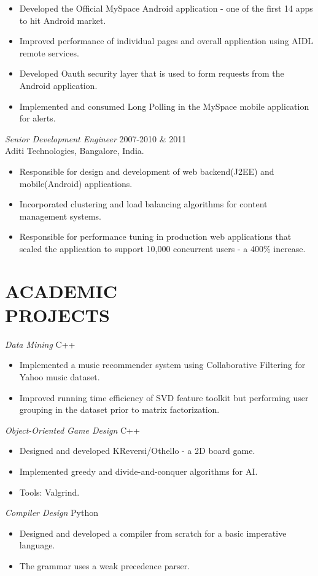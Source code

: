 \documentclass[line,margin]{res}
\begin{document}
\begin{resume}
\begin{itemize}
			\item Developed the Official MySpace Android application - one of the first 14 apps to hit Android market.
			\item Improved performance of individual pages and overall application using AIDL
			remote services.
			\item Developed Oauth security layer that is used to form requests from the Android application. 
			\item Implemented and consumed Long Polling in the MySpace mobile application for alerts.
		\end{itemize} 
		{\sl Senior Development Engineer} \hfill        2007-2010 \& 2011 \\
		Aditi Technologies, Bangalore, India.
		\begin{itemize}
			\item Responsible for design and development of web backend(J2EE) and mobile(Android) applications.
			\item Incorporated clustering and load balancing algorithms for content management systems.
			\item Responsible for performance tuning in production web applications that scaled the application to support 10,000 concurrent users - a 400\% increase.
		\end{itemize} 
		
		
		\section{ACADEMIC \\ PROJECTS}  {\sl Data Mining} \hfill        C++
		\begin{itemize}  \itemsep -2pt %
			\item Implemented a music recommender system using Collaborative Filtering for Yahoo music dataset.
			\item Improved running time efficiency of SVD feature toolkit but performing user grouping in the dataset prior to matrix factorization.
		\end{itemize} 
		{\sl Object-Oriented Game Design}  \hfill        C++
		\begin{itemize} \itemsep -2pt
			\item Designed and developed KReversi/Othello - a 2D board game.
			\item Implemented greedy and divide-and-conquer algorithms for AI.
			\item Tools: Valgrind.
		\end{itemize} 
		{\sl Compiler Design}  \hfill        Python
		\begin{itemize} \itemsep -2pt
			\item Designed and developed a compiler from scratch for a basic imperative language.
			\item The grammar uses a weak precedence parser.       
		\end{itemize}
		

\end{resume}
\end{document}
